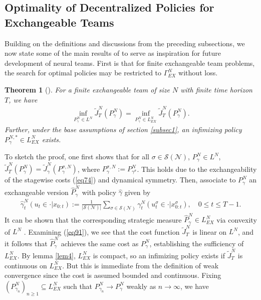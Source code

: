 \documentclass[12pt, oneside]{report}
\newcommand{\1}[1]{\mathbbm{1}_{\{#1\}}}
\newcommand{\mc}[1]{\mathcal{#1}}
\newtheorem{theorem}{Theorem}[section]
\theoremstyle{definition}
\begin{document}
\subsection{Optimality of Decentralized Policies for Exchangeable Teams}
Building on the definitions and discussions from the preceding subsections, we now state some of the main results of \cite{Sanjari_Saldi_Yüksel_2024} to serve as inspiration for future development of neural teams. First is that for finite exchangeable team problems,
the search for optimal policies may be restricted to $\Gamma^N_{EX}$ without loss.
\begin{theorem}[{\cite[theorem 1]{Sanjari_Saldi_Yüksel_2024}}]\label{thm10}
    For a finite exchangeable team of size $N$ with finite time horizon $T$, we have
    \begin{align*}
        \inf_{P^N_\gamma\in L^N}\widetilde{J}^N_T(P^N_\gamma)=\inf_{P^N_\gamma\in L^N_{EX}}\widetilde{J}^N_T(P^N_\gamma).
    \end{align*}
    Further, under the base assumptions of section \ref{subsec1}, an infimizing policy $P^{N,\ast}_\gamma\in L^N_{EX}$ exists.
\end{theorem}
To sketch the proof, one first shows that for all $\sigma\in\mc{S}(\mc{N})$, $P^N_\gamma\in L^N$, $\widetilde{J}^N_T(P^N_\gamma)=\widetilde{J}^N_\gamma(P^{\sigma,N}_\gamma)$, where $P^{\sigma,N}_\gamma:=P^N_{\gamma^\sigma}$.
This holds due to the exchangeability of the stagewise costs (\ref{eq74}) and dynamical symmetry. Then, associate to $P^N_\gamma$ an exchangeable version $\widehat{P}^N_\gamma$ with policy $\widehat{\gamma}$ given by
\begin{align}
    \widehat{\gamma}^N_t(u_t\in\cdot|x_{0:t}):=\frac{1}{|\mc{S}(\mc{N})|}\sum_{\sigma\in\mc{S}(\mc{N})}\gamma^N_t(u^\sigma_t\in\cdot|x^\sigma_{0:t}),\quad 0\leq t\leq T-1.
\end{align}
It can be shown that the corresponding strategic measure $\widehat{P}^N_\gamma\in L^N_{EX}$ via convexity of $L^N$ \cite[theorem 2.4]{Yüksel_Saldi_2017}. Examining (\ref{eq91}), we see that
the cost function $\widetilde{J}^N_T$ is linear on $L^N$, and it follows that $\widehat{P}^N_\gamma$ achieves the same cost as $P^N_\gamma$, establishing the sufficiency of $L^N_{EX}$. By lemma \ref{lem4},
$L^N_{EX}$ is compact, so an infimizing policy exists if $\widetilde{J}^N_T$ is continuous on $L^N_{EX}$. But this is immediate from the definition of weak convergence since the cost is assumed bounded and continuous. Fixing $(P^N_{\gamma_n})_{n\geq 1}\subseteq L^N_{EX}$ such that $P^N_{\gamma_n}\rightarrow P^N_\gamma$ weakly as $n\rightarrow\infty$, we have
\end{document}
